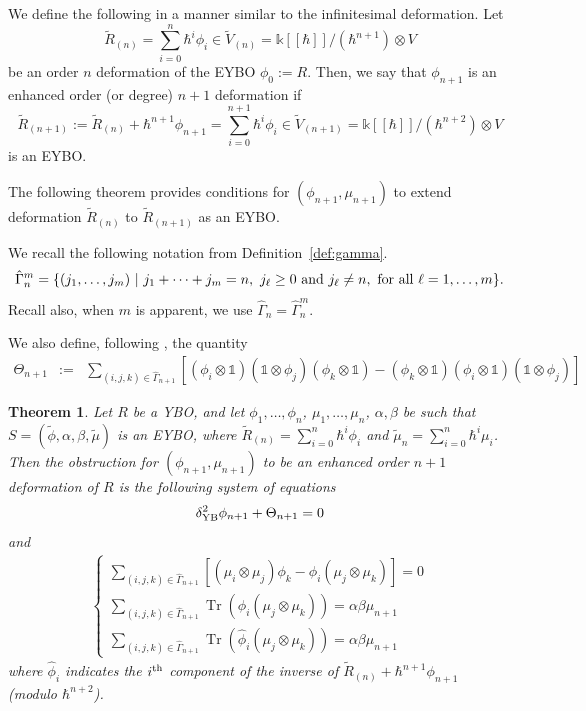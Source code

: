 \documentclass[11pt,fleqn]{amsart} %
\DeclareMathOperator{\tr}{Tr}
\newtheorem{theorem}{Theorem}[section]
\begin{document}
We define the following in a manner similar to the infinitesimal deformation. 
Let 
$$\tilde R_{(n)} = \sum_{i=0}^n \hbar^i\phi_i \in \tilde V_{(n)} = \mathbb k [[\hbar]]/ (\hbar^{n+1} )  \otimes V$$
 be an order $n$ deformation of the EYBO $\phi_0 := R$. 
Then, we say that  $\phi_{n+1}$ is an enhanced order (or degree) $n+1$ deformation if 
$$\tilde R_{(n+1)} := \tilde R_{(n)}  + \hbar^{n+1}\phi_{n+1} =  \sum_{i=0}^{n+1} \hbar^i\phi_i 
\in 
\tilde V_{(n+1)} = \mathbb k [[\hbar]]/ (\hbar^{n+2} ) \otimes V   $$
 is an EYBO. 

			

The following theorem provides conditions for $(\phi_{n+1}, \mu_{n+1})$ 
to extend deformation $\tilde R_{(n)}$ to $\tilde R_{(n+1)}$ as an EYBO. 
 
 We recall the following notation from Definition~\ref{def:gamma}.
 \begin{eqnarray*}
					\hat  \Gamma_n^m = \{(j_1,\ldots,j_m )\ |\  j_1+\cdots +j_m= n, \  j_\ell \geq 0\ {\rm and}\  j_\ell \neq n,\ {\rm for\ all}\ \ell=1,\ldots,m \}.
\end{eqnarray*}
Recall also, when $m$ is apparent, we use $ \hat  \Gamma_n=\hat  \Gamma_n^m$. 

		We also define, following \cite{SZ-YBH}, the quantity
	\begin{eqnarray*}
		\Theta_{n+1} 
		&:=& \sum_{(i,j,k)\in \hat\Gamma_{n+1}} [(\phi_i\otimes \mathbb 1)(\mathbb 1\otimes \phi_j)(\phi_k\otimes \mathbb 1)- (\phi_k\otimes \mathbb 1)(\phi_i\otimes \mathbb 1)(\mathbb 1\otimes \phi_j)]
	\end{eqnarray*} 


 


\begin{theorem}\label{thm:higher_YB_inv}
		Let $R$ be a YBO, and let $\phi_1, \ldots, \phi_n$, $\mu_1, \ldots, \mu_n$, $\alpha, \beta$ be such that $S = (\tilde\phi, \alpha, \beta, \tilde \mu)$ is an EYBO, where $\tilde R_{(n)}= \sum_{i=0}^n \hbar^i\phi_i$ and $\tilde \mu_n = \sum_{i=0}^n \hbar^i\mu_i$. Then the obstruction for $(\phi_{n+1}, \mu_{n+1})$ to be an enhanced order $n+1$ deformation of $R$ is the following system of equations
		\begin{eqnarray}\label{eqn:higher_deform0}
			\delta^2_{\rm YB} \phi_{n+1} + \Theta_{n+1} = 0 
			\end{eqnarray}
			and
		\begin{eqnarray}\label{eqn:higher_deform}
				\begin{cases}
											\sum_{(i,j,k)\in \hat \Gamma_{n+1}} [(\mu_i\otimes \mu_j)\phi_k - \phi_i(\mu_j\otimes \mu_k)] = 0\\
						\sum_{(i,j,k)\in \hat  \Gamma_{n+1}} \tr(\phi_i(\mu_j\otimes \mu_k)) = \alpha\beta\mu_{n+1}\\
						\sum_{(i,j,k)\in  \hat \Gamma_{n+1}} \tr(\hat \phi_i(\mu_j\otimes \mu_k)) = \alpha\beta\mu_{n+1}
				\end{cases}
		\end{eqnarray}
		where $\hat \phi_i$ indicates the $i^{\rm th}$ component of the inverse of $\tilde R_{(n)} + \hbar^{n+1}\phi_{n+1}$ (modulo $\hbar^{n+2}$). 
	\end{theorem}
		
\end{document}
